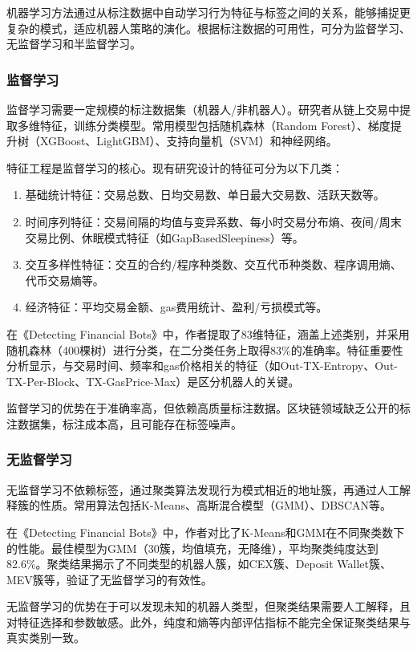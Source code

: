 \par 机器学习方法通过从标注数据中自动学习行为特征与标签之间的关系，能够捕捉更复杂的模式，适应机器人策略的演化。根据标注数据的可用性，可分为监督学习、无监督学习和半监督学习。

\subsubsection {监督学习}
\par 监督学习需要一定规模的标注数据集（机器人/非机器人）。研究者从链上交易中提取多维特征，训练分类模型。常用模型包括随机森林（Random Forest）、梯度提升树（XGBoost、LightGBM）、支持向量机（SVM）和神经网络。
\par 特征工程是监督学习的核心。现有研究设计的特征可分为以下几类：
\begin{enumerate}
    \item 基础统计特征：交易总数、日均交易数、单日最大交易数、活跃天数等。
    \item 时间序列特征：交易间隔的均值与变异系数、每小时交易分布熵、夜间/周末交易比例、休眠模式特征（如GapBasedSleepiness）等。
    \item 交互多样性特征：交互的合约/程序种类数、交互代币种类数、程序调用熵、代币交易熵等。
    \item 经济特征：平均交易金额、gas费用统计、盈利/亏损模式等。
\end{enumerate}
\par 在《Detecting Financial Bots》中，作者提取了83维特征，涵盖上述类别，并采用随机森林（400棵树）进行分类，在二分类任务上取得83\%的准确率。特征重要性分析显示，与交易时间、频率和gas价格相关的特征（如Out-TX-Entropy、Out-TX-Per-Block、TX-GasPrice-Max）是区分机器人的关键。
\par 监督学习的优势在于准确率高，但依赖高质量标注数据。区块链领域缺乏公开的标注数据集，标注成本高，且可能存在标签噪声。

\subsubsection {无监督学习}
\par 无监督学习不依赖标签，通过聚类算法发现行为模式相近的地址簇，再通过人工解释簇的性质。常用算法包括K-Means、高斯混合模型（GMM）、DBSCAN等。
\par 在《Detecting Financial Bots》中，作者对比了K-Means和GMM在不同聚类数下的性能。最佳模型为GMM（30簇，均值填充，无降维），平均聚类纯度达到82.6\%。聚类结果揭示了不同类型的机器人簇，如CEX簇、Deposit Wallet簇、MEV簇等，验证了无监督学习的有效性。
\par 无监督学习的优势在于可以发现未知的机器人类型，但聚类结果需要人工解释，且对特征选择和参数敏感。此外，纯度和熵等内部评估指标不能完全保证聚类结果与真实类别一致。

